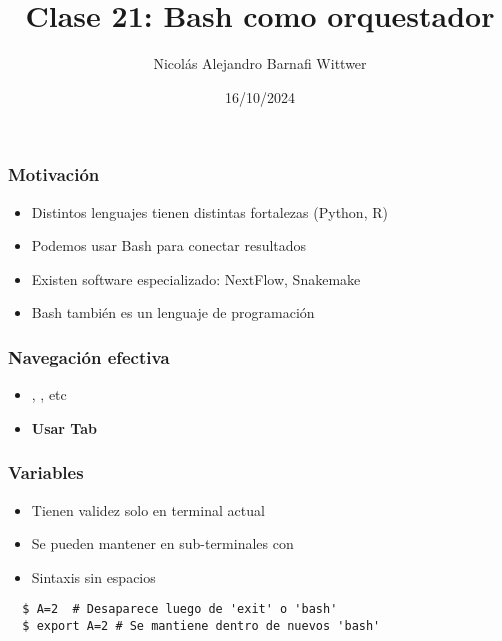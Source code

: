 \documentclass[14pt,aspectratio=169,xcolor=dvipsnames]{beamer}
\title[short title]{Clase 21: Bash como orquestador}
\subtitle{}
\author[NA Barnafi] {Nicolás Alejandro Barnafi Wittwer}
\institute[UC|CMM] 
{
    Pontificia Universidad Católica de Chile \\
    Centro de Modelamiento Matemático
}
\date{16/10/2024}
\begin{document}
\begin{frame}
    \maketitle
\end{frame}
\begin{frame}\frametitle{Motivación}
    \begin{itemize}
        \item Distintos lenguajes tienen distintas fortalezas (Python, R)
        \item Podemos usar Bash para conectar resultados
        \item Existen software especializado: NextFlow, Snakemake
        \item Bash también es un lenguaje de programación
    \end{itemize}
\end{frame}
\begin{frame}\frametitle{Navegación efectiva}
    \begin{itemize}
        \item {}, , etc
        \item \textbf{Usar Tab}
    \end{itemize}

\end{frame}
\begin{frame}[fragile]\frametitle{Variables}
    \begin{itemize}
        \item Tienen validez solo en terminal actual
        \item Se pueden mantener en sub-terminales con 
        \item Sintaxis sin espacios
    \end{itemize}
    
    \begin{verbatim}
  $ A=2  # Desaparece luego de 'exit' o 'bash'
  $ export A=2 # Se mantiene dentro de nuevos 'bash'
    \end{verbatim}
\end{frame}
\end{document}
